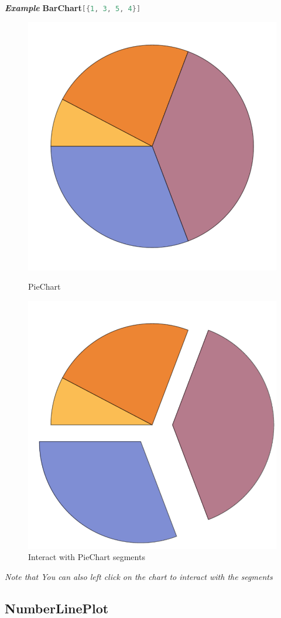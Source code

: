 \documentclass[10pt]{book}
\begin{document}
\noindent\emph{\textbf{Example}}\quad
\textbf{BarChart}\lstinline[language=Mathematica]|[{1, 3, 5, 4}]|
\begin{figure}[H]
\begin{minipage}{.5\linewidth}
  \centering
  \includegraphics[width=0.7\linewidth]{figures/PieChart}
  \caption{PieChart}
\end{minipage}\begin{minipage}{.5\linewidth}
  \centering
  \includegraphics[width=0.7\linewidth]{figures/PieChart2}
  \caption{Interact with PieChart segments}
\end{minipage}
\end{figure}

\noindent\emph{Note that You can also left click on the chart to interact with the segments}

\subsection{NumberLinePlot}
\label{subsec:label}
\end{document}
